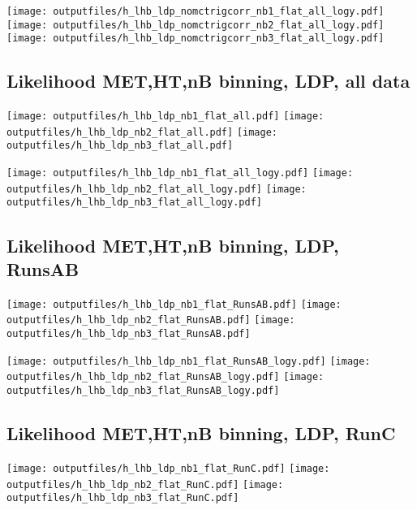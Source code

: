 \documentclass[11pt]{article}
\begin{document}
    \noindent
     \texttt{[image: outputfiles/h\_lhb\_ldp\_nomctrigcorr\_nb1\_flat\_all\_logy.pdf]}
     \texttt{[image: outputfiles/h\_lhb\_ldp\_nomctrigcorr\_nb2\_flat\_all\_logy.pdf]}
     \texttt{[image: outputfiles/h\_lhb\_ldp\_nomctrigcorr\_nb3\_flat\_all\_logy.pdf]}


    \subsection{ Likelihood MET,HT,nB binning, LDP, all data}

    \noindent
     \texttt{[image: outputfiles/h\_lhb\_ldp\_nb1\_flat\_all.pdf]}
     \texttt{[image: outputfiles/h\_lhb\_ldp\_nb2\_flat\_all.pdf]}
     \texttt{[image: outputfiles/h\_lhb\_ldp\_nb3\_flat\_all.pdf]}

    \noindent
     \texttt{[image: outputfiles/h\_lhb\_ldp\_nb1\_flat\_all\_logy.pdf]}
     \texttt{[image: outputfiles/h\_lhb\_ldp\_nb2\_flat\_all\_logy.pdf]}
     \texttt{[image: outputfiles/h\_lhb\_ldp\_nb3\_flat\_all\_logy.pdf]}


    \subsection{ Likelihood MET,HT,nB binning, LDP, RunsAB}

    \noindent
     \texttt{[image: outputfiles/h\_lhb\_ldp\_nb1\_flat\_RunsAB.pdf]}
     \texttt{[image: outputfiles/h\_lhb\_ldp\_nb2\_flat\_RunsAB.pdf]}
     \texttt{[image: outputfiles/h\_lhb\_ldp\_nb3\_flat\_RunsAB.pdf]}

    \noindent
     \texttt{[image: outputfiles/h\_lhb\_ldp\_nb1\_flat\_RunsAB\_logy.pdf]}
     \texttt{[image: outputfiles/h\_lhb\_ldp\_nb2\_flat\_RunsAB\_logy.pdf]}
     \texttt{[image: outputfiles/h\_lhb\_ldp\_nb3\_flat\_RunsAB\_logy.pdf]}


    \subsection{ Likelihood MET,HT,nB binning, LDP, RunC}

    \noindent
     \texttt{[image: outputfiles/h\_lhb\_ldp\_nb1\_flat\_RunC.pdf]}
     \texttt{[image: outputfiles/h\_lhb\_ldp\_nb2\_flat\_RunC.pdf]}
     \texttt{[image: outputfiles/h\_lhb\_ldp\_nb3\_flat\_RunC.pdf]}
\end{document}

